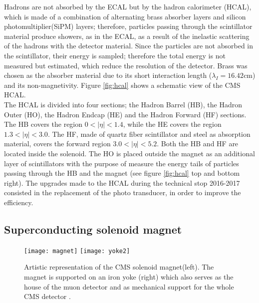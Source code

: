 \noindent Hadrons are not absorbed by the ECAL but by the hadron calorimeter (HCAL), which is made of a combination of alternating brass absorber layers and silicon photomultiplier(SiPM) layers; therefore, particles passing through the scintillator material produce showers, as in the ECAL, as a result of the inelastic scattering of the hadrons with the detector material. Since the particles are not absorbed in the scintillator, their energy is sampled; therefore the total energy is not measured but estimated, which reduce the resolution of the detector. Brass was chosen as the absorber material due to its short interaction length ($\lambda_I=16.42$cm) and its non-magnetivity. Figure \ref{fig:hcal} shows a schematic view of the CMS HCAL.\\

\noindent The HCAL is divided into four sections; the Hadron Barrel (HB), the Hadron Outer (HO), the Hadron Endcap (HE) and the Hadron Forward (HF) sections. The HB covers the region $0<|\eta|<1.4$, while the HE covers the region $1.3<|\eta|<3.0$. The HF, made of quartz fiber scintillator and steel as absorption material, covers the forward region $3.0<|\eta|<5.2$. Both the HB and HF are located inside the solenoid. The HO is placed outside the magnet as an additional layer of scintillators with the purpose of measure the energy tails of particles passing through the HB and the magnet (see figure \ref{fig:hcal} top and bottom right). The upgrades made to the HCAL during the technical stop 2016-2017 consisted in the replacement of the photo transducer, in order to improve the efficiency.

\subsection{Superconducting solenoid magnet}

\begin{figure}[h!]
  \centering
  \texttt{[image: magnet]}
  \texttt{[image: yoke2]}
  \caption[CMS solenoid magnet]{Artistic representation of the CMS solenoid magnet(left). The magnet is supported on an iron yoke (right) which also serves as the house of the muon detector and as mechanical support for the whole CMS detector \cite{yoke2}.}
  \label{fig:yoke}
\end{figure}

